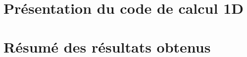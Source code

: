 







\section{Présentation du code de calcul 1D}








\section{Résumé des résultats obtenus}

